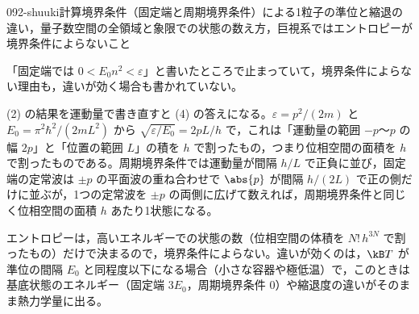 \documentclass[uplatex,dvipdfmx,a4paper,11pt]{jsarticle}
\begin{document}
\begin{mondai}{092-shuuki}{計算}{境界条件（固定端と周期境界条件）による1粒子の準位と縮退の違い，量子数空間の全領域と象限での状態の数え方，巨視系ではエントロピーが境界条件によらないこと}
\begin{kotaeran}
   「固定端では $0<E_{0}n^{2}<\varepsilon$」と書いたところで止まっていて，境界条件によらない理由も，違いが効く場合も書かれていない。
\end{kotaeran}
\begin{rikai}
  \item (2) の結果を運動量で書き直すと (4) の答えになる。$\varepsilon=p^{2}/(2m)$ と $E_{0}=\pi^{2}\hbar^{2}/(2mL^{2})$ から $\sqrt{\varepsilon/E_{0}}=2pL/h$ で，これは「運動量の範囲 $-p$〜$p$ の幅 $2p$」と「位置の範囲 $L$」の積を $h$ で割ったもの，つまり位相空間の面積を $h$ で割ったものである。周期境界条件では運動量が間隔 $h/L$ で正負に並び，固定端の定常波は $\pm p$ の平面波の重ね合わせで $\abs{p}$ が間隔 $h/(2L)$ で正の側だけに並ぶが，1つの定常波を $\pm p$ の両側に広げて数えれば，周期境界条件と同じく位相空間の面積 $h$ あたり1状態になる。
  \item エントロピーは，高いエネルギーでの状態の数（位相空間の体積を $N!\,h^{3N}$ で割ったもの）だけで決まるので，境界条件によらない。違いが効くのは，$\kB T$ が準位の間隔 $E_{0}$ と同程度以下になる場合（小さな容器や極低温）で，このときは基底状態のエネルギー（固定端 $3E_{0}$，周期境界条件 $0$）や縮退度の違いがそのまま熱力学量に出る。
\end{rikai}
\end{mondai}
\end{document}
